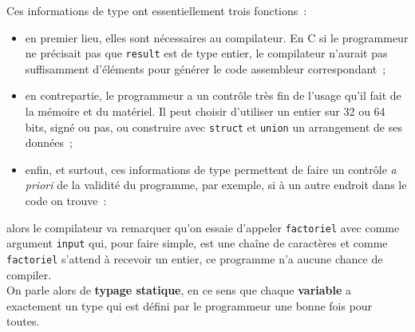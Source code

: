    Ces informations de type ont essentiellement trois fonctions~:

\begin{itemize}
\tightlist
\item
  en premier lieu, elles sont nécessaires au compilateur. En C si le
  programmeur ne précisait pas que \texttt{result} est de type entier,
  le compilateur n'aurait pas suffisamment d'éléments pour générer le
  code assembleur correspondant~;
\item
  en contrepartie, le programmeur a un contrôle très fin de l'usage
  qu'il fait de la mémoire et du matériel. Il peut choisir d'utiliser un
  entier sur 32 ou 64 bits, signé ou pas, ou construire avec
  \texttt{struct} et \texttt{union} un arrangement de ses données~;
\item
  enfin, et surtout, ces informations de type permettent de faire un
  contrôle \emph{a priori} de la validité du programme, par exemple, si
  à un autre endroit dans le code on trouve~:
\end{itemize}

    \begin{Shaded}
\end{Shaded}

    alors le compilateur va remarquer qu'on essaie d'appeler
\texttt{factoriel} avec comme argument \texttt{input} qui, pour faire
simple, est une chaîne de caractères et comme \texttt{factoriel}
s'attend à recevoir un entier, ce programme n'a aucune chance de
compiler.\\

On parle alors de \textbf{typage statique}, en ce sens que chaque
\textbf{variable} a exactement un type qui est défini par le programmeur
une bonne fois pour toutes.\\

